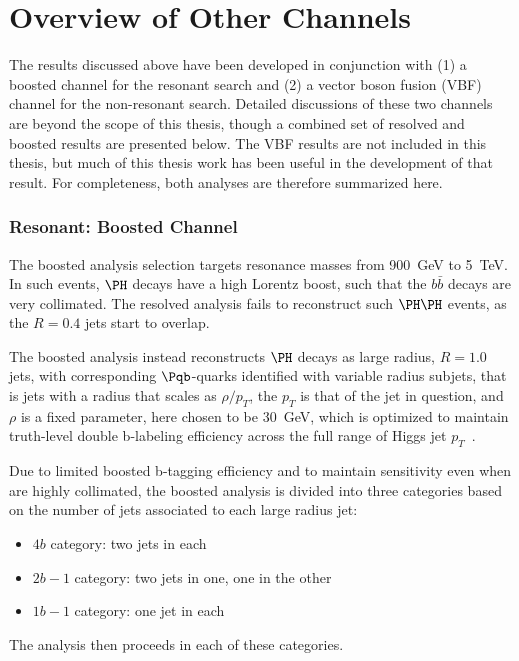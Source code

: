 \chapter{Overview of Other \bbbb Channels}
\label{app:other-channels}
The results discussed above have been developed in conjunction with (1) a boosted channel 
for the resonant search and (2) a vector boson fusion (VBF) channel for the non-resonant search. 
Detailed discussions of these two channels are beyond the scope of this thesis, though a 
combined set of resolved and boosted results are presented below. The VBF results are 
not included in this thesis, but much of this thesis work has been useful in the development 
of that result. For completeness, both analyses are therefore summarized here.

\subsection{Resonant: Boosted Channel}
The boosted analysis selection targets resonance masses from \SI{900}{\GeV} to \SI{5}{\TeV}.
In such events, $\higgs$ decays have a high Lorentz boost, such that the $b\bar{b}$ decays are
very collimated. The resolved analysis fails to reconstruct such $\higgs\higgs$ events, as the 
$R=0.4$ jets start to overlap. 

The boosted analysis instead reconstructs $\higgs$ decays as large radius, $R=1.0$ jets, with 
corresponding $\Pqb$-quarks identified with variable radius subjets, that is jets with a 
radius that scales as $\rho / p_{T}$, the $p_{T}$ is that of the jet in question, and
$\rho$ is a fixed parameter, here chosen to be \SI{30}{\GeV}, which is optimized to maintain 
truth-level double b-labeling efficiency across the full range of Higgs jet $p_{T}$~\cite{ATL-PHYS-PUB-2017-010}.

Due to limited boosted b-tagging efficiency and to maintain sensitivity 
even when \bjets are highly collimated, the boosted analysis is divided into three categories 
based on the number of \btagged jets associated to each large radius jet:
\begin{itemize}
	\item $4b$ category: two \btagged jets in each
	\item $2b-1$ category: two \btagged jets in one, one in the other
	\item $1b-1$ category: one \btagged jet in each
\end{itemize} 

The analysis then proceeds in each of these categories.


